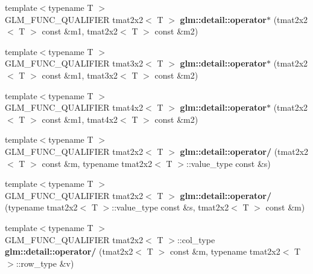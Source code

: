 \begin{DoxyCompactItemize}
\item 
\hypertarget{namespaceglm_1_1detail_a77408598000d67c2dbb3bf0eb17c828b}{}{\footnotesize template$<$typename T $>$ }\\G\+L\+M\+\_\+\+F\+U\+N\+C\+\_\+\+Q\+U\+A\+L\+I\+F\+I\+E\+R tmat2x2$<$ T $>$ {\bfseries glm\+::detail\+::operator$\ast$} (tmat2x2$<$ T $>$ const \&m1, tmat2x2$<$ T $>$ const \&m2)\label{namespaceglm_1_1detail_a77408598000d67c2dbb3bf0eb17c828b}

\item 
\hypertarget{namespaceglm_1_1detail_a29c589fdf1db79d32c2cdcaeddbee2f2}{}{\footnotesize template$<$typename T $>$ }\\G\+L\+M\+\_\+\+F\+U\+N\+C\+\_\+\+Q\+U\+A\+L\+I\+F\+I\+E\+R tmat3x2$<$ T $>$ {\bfseries glm\+::detail\+::operator$\ast$} (tmat2x2$<$ T $>$ const \&m1, tmat3x2$<$ T $>$ const \&m2)\label{namespaceglm_1_1detail_a29c589fdf1db79d32c2cdcaeddbee2f2}

\item 
\hypertarget{namespaceglm_1_1detail_ad765e69f705999671458236fc5271e0b}{}{\footnotesize template$<$typename T $>$ }\\G\+L\+M\+\_\+\+F\+U\+N\+C\+\_\+\+Q\+U\+A\+L\+I\+F\+I\+E\+R tmat4x2$<$ T $>$ {\bfseries glm\+::detail\+::operator$\ast$} (tmat2x2$<$ T $>$ const \&m1, tmat4x2$<$ T $>$ const \&m2)\label{namespaceglm_1_1detail_ad765e69f705999671458236fc5271e0b}

\item 
\hypertarget{namespaceglm_1_1detail_af6a4bb1f648c3f304c3df0eb232e92b4}{}{\footnotesize template$<$typename T $>$ }\\G\+L\+M\+\_\+\+F\+U\+N\+C\+\_\+\+Q\+U\+A\+L\+I\+F\+I\+E\+R tmat2x2$<$ T $>$ {\bfseries glm\+::detail\+::operator/} (tmat2x2$<$ T $>$ const \&m, typename tmat2x2$<$ T $>$\+::value\+\_\+type const \&s)\label{namespaceglm_1_1detail_af6a4bb1f648c3f304c3df0eb232e92b4}

\item 
\hypertarget{namespaceglm_1_1detail_a38fd054976ac62c77c250ae9c8c159df}{}{\footnotesize template$<$typename T $>$ }\\G\+L\+M\+\_\+\+F\+U\+N\+C\+\_\+\+Q\+U\+A\+L\+I\+F\+I\+E\+R tmat2x2$<$ T $>$ {\bfseries glm\+::detail\+::operator/} (typename tmat2x2$<$ T $>$\+::value\+\_\+type const \&s, tmat2x2$<$ T $>$ const \&m)\label{namespaceglm_1_1detail_a38fd054976ac62c77c250ae9c8c159df}

\item 
\hypertarget{namespaceglm_1_1detail_a9536cd5c5d11934a15c37f40e6ffe443}{}{\footnotesize template$<$typename T $>$ }\\G\+L\+M\+\_\+\+F\+U\+N\+C\+\_\+\+Q\+U\+A\+L\+I\+F\+I\+E\+R tmat2x2$<$ T $>$\+::col\+\_\+type {\bfseries glm\+::detail\+::operator/} (tmat2x2$<$ T $>$ const \&m, typename tmat2x2$<$ T $>$\+::row\+\_\+type \&v)\label{namespaceglm_1_1detail_a9536cd5c5d11934a15c37f40e6ffe443}


\end{DoxyCompactItemize}
